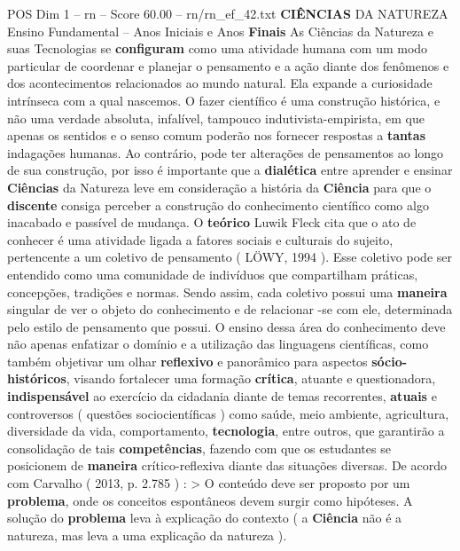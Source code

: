\begin{textsample}{POS Dim 1 – rn – Score 60.00 – rn/rn\_ef\_42.txt}  \label{ex:f1_pos_262}
\textbf{CIÊNCIAS} DA NATUREZA Ensino Fundamental – Anos Iniciais e Anos \textbf{Finais} As Ciências da Natureza e suas Tecnologias se \textbf{configuram} como uma atividade humana com um modo particular de coordenar e planejar o pensamento e a ação diante dos fenômenos e dos acontecimentos relacionados ao mundo natural.
Ela expande a curiosidade intrínseca com a qual nascemos.
O fazer científico é uma construção histórica, e não uma verdade absoluta, infalível, tampouco indutivista-empirista, em que apenas os sentidos e o senso comum poderão nos fornecer respostas a \textbf{tantas} indagações humanas.
Ao contrário, pode ter alterações de pensamentos ao longo de sua construção, por isso é importante que a \textbf{dialética} entre aprender e ensinar \textbf{Ciências} da Natureza leve em consideração a história da \textbf{Ciência} para que o \textbf{discente} consiga perceber a construção do conhecimento científico como algo inacabado e passível de mudança.
O \textbf{teórico} Luwik Fleck cita que o ato de conhecer é uma atividade ligada a fatores sociais e culturais do sujeito, pertencente a um coletivo de pensamento ( LÖWY, 1994 ).
Esse coletivo pode ser entendido como uma comunidade de indivíduos que compartilham práticas, concepções, tradições e normas.
Sendo assim, cada coletivo possui uma \textbf{maneira} singular de ver o objeto do conhecimento e de relacionar -se com ele, determinada pelo estilo de pensamento que possui.
O ensino dessa área do conhecimento deve não apenas enfatizar o domínio e a utilização das linguagens científicas, como também objetivar um olhar \textbf{reflexivo} e panorâmico para aspectos \textbf{sócio-históricos}, visando fortalecer uma formação \textbf{crítica}, atuante e questionadora, \textbf{indispensável} ao exercício da cidadania diante de temas recorrentes, \textbf{atuais} e controversos ( questões sociocientíficas ) como saúde, meio ambiente, agricultura, diversidade da vida, comportamento, \textbf{tecnologia}, entre outros, que garantirão a consolidação de tais \textbf{competências}, fazendo com que os estudantes se posicionem de \textbf{maneira} crítico-reflexiva diante das situações diversas.
De acordo com Carvalho ( 2013, p. 2.785 ) : > O conteúdo deve ser proposto por um \textbf{problema}, onde os conceitos espontâneos devem surgir como hipóteses.
A solução do \textbf{problema} leva à explicação do contexto ( a \textbf{Ciência} não é a natureza, mas leva a uma explicação da natureza ).

\end{textsample}
